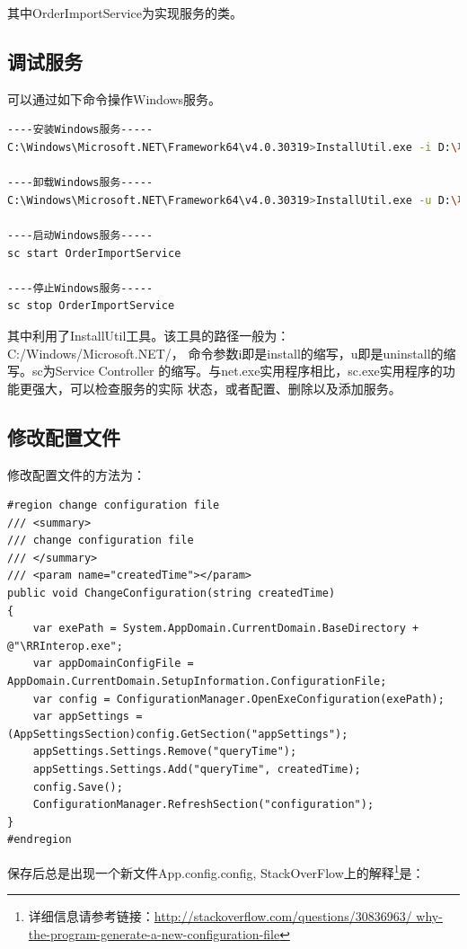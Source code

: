 \documentclass{book}
\begin{document}
其中OrderImportService为实现服务的类。

\subsection{调试服务}

可以通过如下命令操作Windows服务。

\begin{lstlisting}[language=Bash]
----安装Windows服务-----
C:\Windows\Microsoft.NET\Framework64\v4.0.30319>InstallUtil.exe -i D:\项目\zouwo\RRInterop\bin\Debug\RRInterop.exe

----卸载Windows服务-----
C:\Windows\Microsoft.NET\Framework64\v4.0.30319>InstallUtil.exe -u D:\项目\zouwo\RRInterop\bin\Debug\RRInterop.exe

----启动Windows服务-----
sc start OrderImportService

----停止Windows服务-----
sc stop OrderImportService
\end{lstlisting}

其中利用了InstallUtil工具。该工具的路径一般为：C:/Windows/Microsoft.NET/，
命令参数i即是install的缩写，u即是uninstall的缩写。sc为Service Controller
的缩写。与net.exe实用程序相比，sc.exe实用程序的功能更强大，可以检查服务的实际
状态，或者配置、删除以及添加服务。

\subsection{修改配置文件}

修改配置文件的方法为：

\begin{lstlisting}[language={[Sharp]C}]
#region change configuration file
/// <summary>
/// change configuration file
/// </summary>
/// <param name="createdTime"></param>
public void ChangeConfiguration(string createdTime)
{
	var exePath = System.AppDomain.CurrentDomain.BaseDirectory + @"\RRInterop.exe";     
    var appDomainConfigFile = AppDomain.CurrentDomain.SetupInformation.ConfigurationFile;
    var config = ConfigurationManager.OpenExeConfiguration(exePath);
    var appSettings = (AppSettingsSection)config.GetSection("appSettings");
    appSettings.Settings.Remove("queryTime");
    appSettings.Settings.Add("queryTime", createdTime);
    config.Save();
    ConfigurationManager.RefreshSection("configuration");
}
#endregion
\end{lstlisting}

保存后总是出现一个新文件App.config.config,
StackOverFlow上的解释\footnote{详细信息请参考链接：\url{http://stackoverflow.com/questions/30836963/
why-the-program-generate-a-new-configuration-file}}是：
\end{document}
